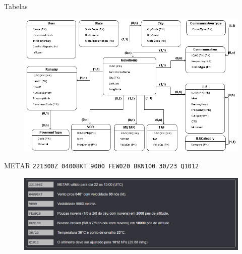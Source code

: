 \documentclass{beamer}
\begin{document}
\begin{frame}{Tabelas}
    \begin{figure}[ht]
        \begin{center}
        \includegraphics[width=0.8\linewidth]{img/ERAero.png}
        \label{fig:arquitetura}
        \end{center}
    \end{figure}
\end{frame}

\begin{frame}{METAR}
    \centering
    \small{\texttt{221300Z 04008KT 9000 FEW020 BKN100 30/23 Q1012}}
    \begin{figure}[ht]
        \begin{center}
        \includegraphics[width=0.8\linewidth]{img/METAR-SBBE.png}
        \label{fig:UI}
        \end{center}
    \end{figure}
\end{frame}
\end{document}
